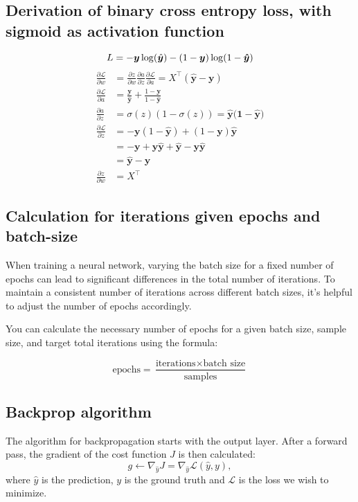 \documentclass{article}
\begin{document}
\subsection*{Derivation of binary cross entropy loss, with sigmoid as activation function}
\begin{equation*}
    L = -\bm{y} \log(\hat{\bm{y}}) - (1 - \bm{y}) \log (1 - \bm{\hat{y}}) \\
\end{equation*}
\begin{align*}
    \frac{\partial \mathcal{L}}{\partial w} &= \frac{\partial z}{\partial w} \frac{\partial a}{\partial z} \frac{\partial \mathcal{L}}{\partial a} = X^{\top}(\hat{\bm{y}} - \bm{y}) \\
    \frac{\partial \mathcal{L}}{\partial a} &= \frac{\bm{y}}{\bm{\hat{y}}} + \frac{1 - \bm{y}}{1 - \bm{\hat{y}}} \\
    \frac{\partial a}{\partial z} &= \sigma(z)(1 - \sigma(z)) = \bm{\hat{y}(1 - \bm{\hat{y}}})\\
    \frac{\partial \mathcal{L}}{\partial z} &= -\bm{y}(1 - \bm{\hat{y}}) + (1 - \bm{y})\bm{\hat{y}} \\
    &= -\bm{y}+\bm{y\hat{y}} + \bm{\hat{y}} - \bm{y\hat{y}} \\
    &= \bm{\hat{y}} - \bm{y} \\
    \frac{\partial z}{\partial w} &= X^{\top}
\end{align*}

\subsection*{Calculation for iterations given epochs and batch-size}
When training a neural network, varying the batch size for a fixed number of epochs can lead to significant differences in the total number of iterations. To maintain a consistent number of iterations across different batch sizes, it’s helpful to adjust the number of epochs accordingly.

You can calculate the necessary number of epochs for a given batch size, sample size, and target total iterations using the formula:

$$\text{epochs} = \frac{\text{iterations} \times \text{batch size}}{\text{samples}}$$

\subsection*{Backprop algorithm}
The algorithm for backpropagation starts with the output layer. After a forward pass, the gradient of the cost function $J$ is then calculated:
\begin{equation*}
    g \gets \nabla_{\hat{y}} J = \nabla_{\hat{y}}\mathcal{L}(\hat{y}, y),
\end{equation*} where $\hat{y}$ is the prediction, $y$ is the ground truth and $\mathcal{L}$ is the loss we wish to minimize.
\end{document}
